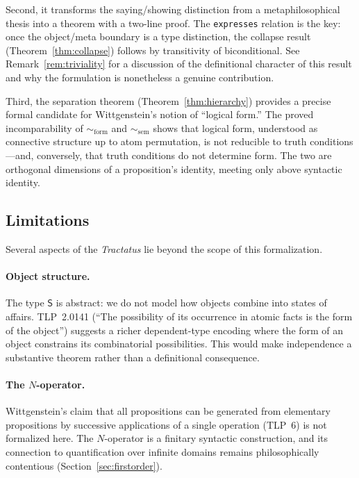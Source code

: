\documentclass[10pt, letterpaper]{article}
\theoremstyle{definition}
\theoremstyle{remark}
\newcommand{\Sach}{\mathsf{S}}
\newcommand{\formEq}{\sim_{\mathrm{form}}}
\newcommand{\semEq}{\sim_{\mathrm{sem}}}
\begin{document}
Second, it transforms the saying/showing distinction from a
metaphilosophical thesis into a theorem with a two-line proof.
The \texttt{expresses} relation is the key: once the
object/meta boundary is a type distinction, the collapse result
(Theorem~\ref{thm:collapse}) follows by transitivity of
biconditional.  See Remark~\ref{rem:triviality} for a
discussion of the definitional character of this result and
why the formulation is nonetheless a genuine contribution.

Third, the separation theorem (Theorem~\ref{thm:hierarchy})
provides a precise formal candidate for Wittgenstein's
notion of ``logical form.''  The proved incomparability of
$\formEq$ and $\semEq$ shows that logical form, understood as
connective structure up to atom permutation, is not reducible to
truth conditions---and, conversely, that truth conditions do not
determine form.  The two are orthogonal dimensions of a
proposition's identity, meeting only above syntactic identity.

\subsection{Limitations}
\label{sec:limitations}

Several aspects of the \emph{Tractatus} lie beyond the scope of
this formalization.

\paragraph{Object structure.}
The type $\Sach$ is abstract: we do not model how objects combine
into states of affairs.  TLP~2.0141 (``The possibility of its
occurrence in atomic facts is the form of the object'') suggests
a richer dependent-type encoding where the form of an object
constrains its combinatorial possibilities.  This would make
independence a substantive theorem rather than a definitional
consequence.

\paragraph{The $N$-operator.}
Wittgenstein's claim that all propositions can be generated from
elementary propositions by successive applications of a single
operation (TLP~6) is not formalized here.  The $N$-operator is
a finitary syntactic construction, and its connection to
quantification over infinite domains remains philosophically
contentious (Section~\ref{sec:firstorder}).
\end{document}
